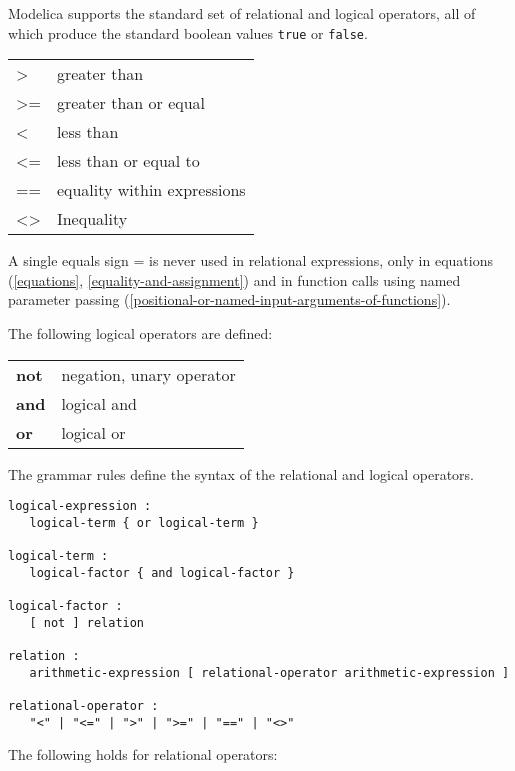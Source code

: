 Modelica supports the standard set of relational and logical operators,
all of which produce the standard boolean values \lstinline[basicstyle=\ttfamily]!true! or \lstinline[basicstyle=\ttfamily]!false!.

\begin{longtable}[]{ll}
\textgreater{} & greater than\\ 
\textgreater{}= & greater than or equal\\ 
\textless{} & less than\\
\textless{}= & less than or equal to\\ 
== & equality within expressions\\ 
\textless{}\textgreater{} & Inequality\\ 
\end{longtable}

A single equals sign = is never used in relational expressions, only in
equations (\autoref{equations}, \autoref{equality-and-assignment}) and in function calls using named
parameter passing (\autoref{positional-or-named-input-arguments-of-functions}).

The following logical operators are defined:

\begin{longtable}[]{ll}
\textbf{not} & negation, unary operator\\ 
\textbf{and} & logical and\\ 
\textbf{or} & logical or\\ 
\end{longtable}

The grammar rules define the syntax of the relational and logical
operators.

\begin{lstlisting}[language=grammar]
logical-expression :
   logical-term { or logical-term }
  
logical-term :
   logical-factor { and logical-factor }
   
logical-factor :
   [ not ] relation
   
relation :
   arithmetic-expression [ relational-operator arithmetic-expression ]
   
relational-operator :
   "<" | "<=" | ">" | ">=" | "==" | "<>"
\end{lstlisting}

The following holds for relational operators:

